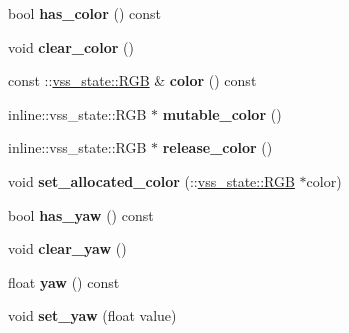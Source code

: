 \begin{DoxyCompactItemize}
\item 
bool {\bfseries has\+\_\+color} () const \hypertarget{classvss__state_1_1Robot__State_a319868975523f46fce84fedda26c478e}{}\label{classvss__state_1_1Robot__State_a319868975523f46fce84fedda26c478e}

\item 
void {\bfseries clear\+\_\+color} ()\hypertarget{classvss__state_1_1Robot__State_a0d95199c67056fd8a0b6bb873d278392}{}\label{classvss__state_1_1Robot__State_a0d95199c67056fd8a0b6bb873d278392}

\item 
const \+::\hyperlink{classvss__state_1_1RGB}{vss\+\_\+state\+::\+R\+GB} \& {\bfseries color} () const \hypertarget{classvss__state_1_1Robot__State_a1e8b02c137ceae1f7a875bdf5371aa91}{}\label{classvss__state_1_1Robot__State_a1e8b02c137ceae1f7a875bdf5371aa91}

\item 
inline\+::vss\+\_\+state\+::\+R\+GB $\ast$ {\bfseries mutable\+\_\+color} ()\hypertarget{classvss__state_1_1Robot__State_aa91b85fa199de6f9b4673529f86f1d01}{}\label{classvss__state_1_1Robot__State_aa91b85fa199de6f9b4673529f86f1d01}

\item 
inline\+::vss\+\_\+state\+::\+R\+GB $\ast$ {\bfseries release\+\_\+color} ()\hypertarget{classvss__state_1_1Robot__State_aba8a8ff5aa02a978e3ff2e8b6335f0ce}{}\label{classvss__state_1_1Robot__State_aba8a8ff5aa02a978e3ff2e8b6335f0ce}

\item 
void {\bfseries set\+\_\+allocated\+\_\+color} (\+::\hyperlink{classvss__state_1_1RGB}{vss\+\_\+state\+::\+R\+GB} $\ast$color)\hypertarget{classvss__state_1_1Robot__State_a368a1f90ce946cd075aa050885e1e6d3}{}\label{classvss__state_1_1Robot__State_a368a1f90ce946cd075aa050885e1e6d3}

\item 
bool {\bfseries has\+\_\+yaw} () const \hypertarget{classvss__state_1_1Robot__State_a7f07f9c8c553babff64eb056a103c189}{}\label{classvss__state_1_1Robot__State_a7f07f9c8c553babff64eb056a103c189}

\item 
void {\bfseries clear\+\_\+yaw} ()\hypertarget{classvss__state_1_1Robot__State_a1f023fdc194aea61557b0cba586e3b1a}{}\label{classvss__state_1_1Robot__State_a1f023fdc194aea61557b0cba586e3b1a}

\item 
float {\bfseries yaw} () const \hypertarget{classvss__state_1_1Robot__State_a16a51084f1e143e9cc0eff17991f42fe}{}\label{classvss__state_1_1Robot__State_a16a51084f1e143e9cc0eff17991f42fe}

\item 
void {\bfseries set\+\_\+yaw} (float value)\hypertarget{classvss__state_1_1Robot__State_a80d78f0f346441c0e0407ff6503ee3eb}{}\label{classvss__state_1_1Robot__State_a80d78f0f346441c0e0407ff6503ee3eb}

\end{DoxyCompactItemize}
